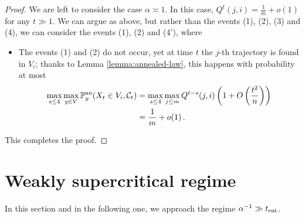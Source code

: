 \documentclass[11pt,oneside]{amsart}
\numberwithin{equation}{section}  %
\theoremstyle{plain}
\newcommand{\p}{\mathbb{P}}
\newcommand{\tent}{t_{\textup{ent}}}
\newcommand{\pan}{\p^{\textup{an}}}
\newcommand{\semi}{{Q}}
\begin{document}
\begin{proof}
			 We are left to consider the case $\alpha\asymp 1$. In this case, $Q^t(j,i)=\frac1m+o(1)$ for any $t\gg1$. We can argue as above, but rather than the events (1), (2), (3) and (4), we can consider the events (1), (2) and (4'), where
			 \begin{itemize}
			 	\item[(4')] The events (1) and (2) do not occur, yet at time $t$ the $j$-th trajectory is found in $V_i$; thanks to Lemma \ref{lemma:annealed-law}, this happens with probability at most
			 	\begin{align*}
			 		\max_{s\le 4}\max_{y\in V}\pan_y(X_{t}\in V_i,\mathcal{C}_{t})&=\max_{s\le 4}\max_{j \le m}\semi^{t-s}(j,i)\left(1+O\left(\frac{t^2}n\right)\right)\\
			 		&=\frac1m+o(1)\,.
			 	\end{align*}
			 \end{itemize}
			 This completes the proof.
		\end{proof}

\section{Weakly supercritical regime}\label{sec:super-weak}

In this section and in the following one, we approach the regime $\alpha^{-1} \gg \tent$.
\end{document}
